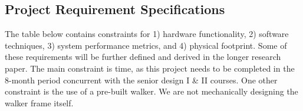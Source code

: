 \subsection{Project Requirement Specifications}
\newline
\indent The table below contains constraints for 1) hardware functionality, 2) software techniques, 3) system performance metrics, and 4) physical footprint. Some of these requirements will be further defined and derived in the longer research paper. The main constraint is time, as this project needs to be completed in the 8-month period concurrent with the senior design I & II courses. One other constraint is the use of a pre-built walker. We are not mechanically designing the walker frame itself.

